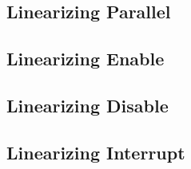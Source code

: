 \subsection{Linearizing Parallel}

\subsection{Linearizing Enable}

\subsection{Linearizing Disable}

\subsection{Linearizing Interrupt}



